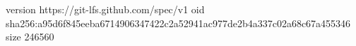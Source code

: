 version https://git-lfs.github.com/spec/v1
oid sha256:a95d6f845eeba6714906347422c2a52941ac977de2b4a337c02a68c67a455346
size 246560
